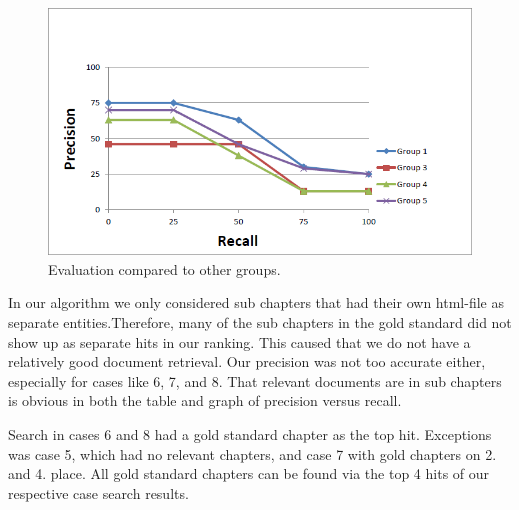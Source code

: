 \begin{figure}[h]
\caption{Evaluation compared to other groups.}
\centering
\includegraphics[scale=0.75]{evaluation_and_discussion/TotalEval.png}
\end{figure}

In our algorithm we only considered sub chapters that had their own html-file as separate entities.Therefore, many of the sub chapters in the gold standard did not show up as separate hits in our ranking. This caused that we do not have a relatively good document retrieval. Our precision was not too accurate either, especially for cases like 6, 7, and 8. That relevant documents are in sub chapters is obvious in both the table and graph of precision versus recall.

Search in cases 6 and 8 had a gold standard chapter as the top hit. Exceptions was case 5, which had no relevant chapters, and case 7 with gold chapters on 2. and 4. place. All gold standard chapters can be found via the top 4 hits of our respective case search results.